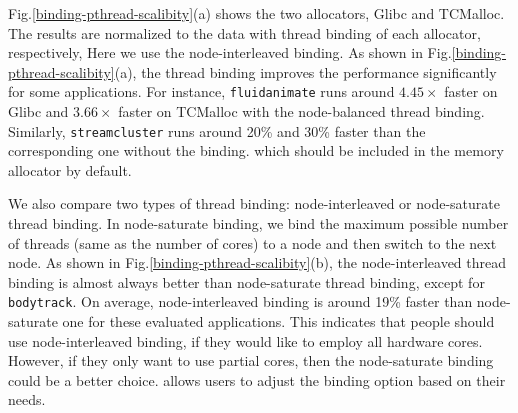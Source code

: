 Fig.\ref{binding-pthread-scalibity}(a) shows the  two allocators, Glibc and TCMalloc.
The results are normalized to the data with thread binding of each allocator, respectively, 
Here we use the node-interleaved binding. As shown in Fig.\ref{binding-pthread-scalibity}(a), the thread binding improves the performance significantly for some applications. For instance, \texttt{fluidanimate} runs around $4.45\times$ faster on Glibc and $3.66\times$ faster on TCMalloc with the node-balanced thread binding. Similarly, \texttt{streamcluster} runs around 20\% and 30\% faster than the corresponding one without the binding. 
which should be included in the memory allocator by default. 


We also compare two types of thread binding: node-interleaved or node-saturate thread binding. In node-saturate binding, we bind the maximum possible number of threads (same as the number of cores) to a node and then switch to the next node. As shown in Fig.\ref{binding-pthread-scalibity}(b), the node-interleaved thread binding is almost always better than node-saturate thread binding, except for \texttt{bodytrack}. On average, node-interleaved binding is around 19\% faster than node-saturate one for these evaluated applications. This indicates that people should use node-interleaved binding, if they would like to employ all hardware cores. However, if they only want to use partial cores, then the node-saturate binding could be a better choice. \NM{} allows users to adjust the binding option based on their needs.

